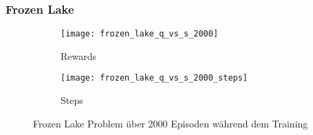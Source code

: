 \subsubsection{Frozen Lake}

\begin{figure}[H]
    \centering
    \begin{subfigure}{.5\textwidth}
      \centering
      \texttt{[image: frozen\_lake\_q\_vs\_s\_2000]}
      \caption{Rewards}
      \label{fig:frozen_rew}
    \end{subfigure}%
    \begin{subfigure}{.5\textwidth}
      \centering
      \texttt{[image: frozen\_lake\_q\_vs\_s\_2000\_steps]}
      \caption{Steps}
      \label{fig:frozen_step}
    \end{subfigure}
    \caption{Frozen Lake Problem über 2000 Episoden während dem Training}
    \label{fig:frozen_train}
\end{figure}

